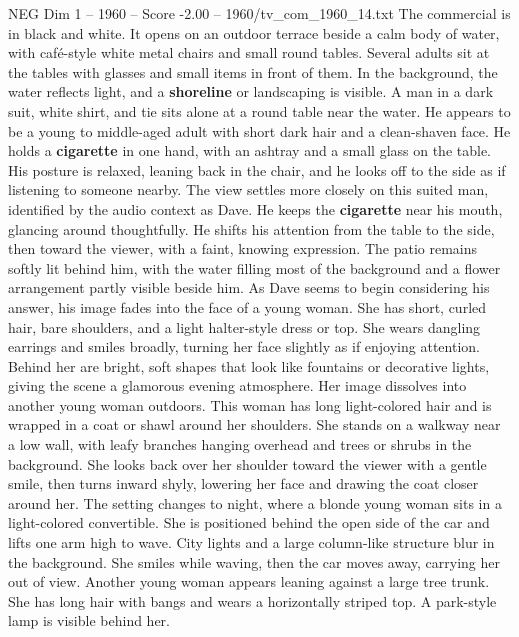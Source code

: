 \begin{textsample}{NEG Dim 1 – 1960 – Score -2.00 – 1960/tv\_com\_1960\_14.txt}  \label{ex:f1_neg_030}
The commercial is in black and white.
It opens on an outdoor terrace beside a calm body of water, with café-style white metal chairs and small round tables.
Several adults sit at the tables with glasses and small items in front of them.
In the background, the water reflects light, and a \textbf{shoreline} or landscaping is visible.
A man in a dark suit, white shirt, and tie sits alone at a round table near the water.
He appears to be a young to middle-aged adult with short dark hair and a clean-shaven face.
He holds a \textbf{cigarette} in one hand, with an ashtray and a small glass on the table.
His posture is relaxed, leaning back in the chair, and he looks off to the side as if listening to someone nearby.
The view settles more closely on this suited man, identified by the audio context as Dave.
He keeps the \textbf{cigarette} near his mouth, glancing around thoughtfully.
He shifts his attention from the table to the side, then toward the viewer, with a faint, knowing expression.
The patio remains softly lit behind him, with the water filling most of the background and a flower arrangement partly visible beside him.
As Dave seems to begin considering his answer, his image fades into the face of a young woman.
She has short, curled hair, bare shoulders, and a light halter-style dress or top.
She wears dangling earrings and smiles broadly, turning her face slightly as if enjoying attention.
Behind her are bright, soft shapes that look like fountains or decorative lights, giving the scene a glamorous evening atmosphere.
Her image dissolves into another young woman outdoors.
This woman has long light-colored hair and is wrapped in a coat or shawl around her shoulders.
She stands on a walkway near a low wall, with leafy branches hanging overhead and trees or shrubs in the background.
She looks back over her shoulder toward the viewer with a gentle smile, then turns inward shyly, lowering her face and drawing the coat closer around her.
The setting changes to night, where a blonde young woman sits in a light-colored convertible.
She is positioned behind the open side of the car and lifts one arm high to wave.
City lights and a large column-like structure blur in the background.
She smiles while waving, then the car moves away, carrying her out of view.
Another young woman appears leaning against a large tree trunk.
She has long hair with bangs and wears a horizontally striped top.
A park-style lamp is visible behind her.

\end{textsample}
